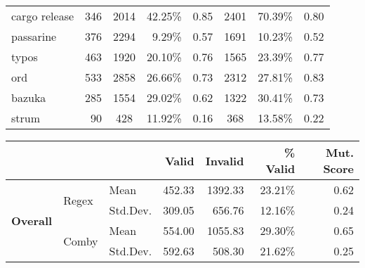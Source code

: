 \documentclass[acmsmall]{acmart}
\newcommand{\mr}[2]{\multirow{#1}{*}{#2}}
\begin{document}
{\begin{table}[hbtp]
\begin{varwidth}{.8\linewidth}
\begin{tabularx}{\linewidth}{X|r|crr|crr}
cargo release    & 346          & 2014   & 42.25\%  & 0.85
& 2401   & 70.39\% & 0.80\\
passarine        & 376          & 2294   & 9.29\%  & 0.57
 & 1691   & 10.23\% & 0.52\\
typos            & 463          & 1920   & 20.10\% & 0.76  & 1565   & 23.39\% & 0.77\\
ord              & 533          & 2858   & 26.66\%  & 0.73
& 2312   & 27.81\% & 0.83\\
bazuka           & 285          & 1554   & 29.02\% & 0.62 & 1322   & 30.41\% & 0.73\\
strum            & 90           & 428     & 11.92\% & 0.16 & 368    & 13.58\% & 0.22\\\bottomrule
\end{tabularx}
\begin{tabularx}{\linewidth}{Xllrrrr}
               & & & \textbf{Valid}  & \textbf{Invalid}  & \textbf{\% Valid} & \textbf{Mut. Score} \\\midrule
 \multirow{4}{*}{\textbf{Overall}} & \mr{2}{Regex} & Mean     &  452.33 &  1392.33 & 23.21\% & 0.62\\
               &   & Std.Dev. & 309.05 & 656.76 & 12.16\%  & 0.24\\\cline{2-7}
 & \mr{2}{Comby} & Mean     & 554.00 &  1055.83 & 29.30\% & 0.65\\
               &   & Std.Dev. & 592.63 & 508.30 & 21.62\%  & 0.25\\\bottomrule
\end{tabularx}
\end{varwidth}
\end{table}


}
\end{document}
